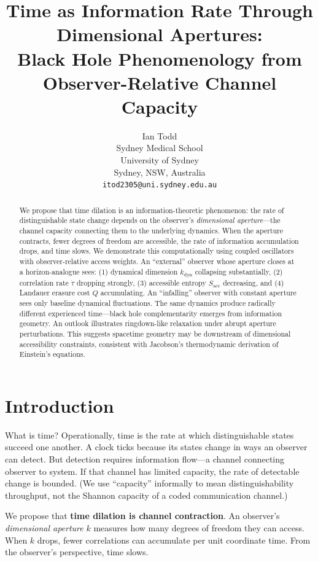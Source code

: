 \documentclass[11pt,a4paper]{article}
\title{Time as Information Rate Through Dimensional Apertures:\\ Black Hole Phenomenology from Observer-Relative Channel Capacity}
\author{Ian Todd\\
Sydney Medical School\\
University of Sydney\\
Sydney, NSW, Australia\\
\texttt{itod2305@uni.sydney.edu.au}}
\date{}
\begin{document}
\maketitle

\begin{abstract}
We propose that time dilation is an information-theoretic phenomenon: the rate of distinguishable state change depends on the observer's \emph{dimensional aperture}---the channel capacity connecting them to the underlying dynamics. When the aperture contracts, fewer degrees of freedom are accessible, the rate of information accumulation drops, and time slows. We demonstrate this computationally using coupled oscillators with observer-relative access weights. An ``external'' observer whose aperture closes at a horizon-analogue sees: (1) dynamical dimension $k_{\mathrm{dyn}}$ collapsing substantially, (2) correlation rate $\dot{\tau}$ dropping strongly, (3) accessible entropy $S_{\mathrm{acc}}$ decreasing, and (4) Landauer erasure cost $Q$ accumulating. An ``infalling'' observer with constant aperture sees only baseline dynamical fluctuations. The same dynamics produce radically different experienced time---black hole complementarity emerges from information geometry. An outlook illustrates ringdown-like relaxation under abrupt aperture perturbations. This suggests spacetime geometry may be downstream of dimensional accessibility constraints, consistent with Jacobson's thermodynamic derivation of Einstein's equations.
\end{abstract}

\section{Introduction}

What is time? Operationally, time is the rate at which distinguishable states succeed one another. A clock ticks because its states change in ways an observer can detect. But detection requires information flow---a channel connecting observer to system. If that channel has limited capacity, the rate of detectable change is bounded. (We use ``capacity'' informally to mean distinguishability throughput, not the Shannon capacity of a coded communication channel.)

We propose that \textbf{time dilation is channel contraction}. An observer's \emph{dimensional aperture} $k$ measures how many degrees of freedom they can access. When $k$ drops, fewer correlations can accumulate per unit coordinate time. From the observer's perspective, time slows.
\end{document}
